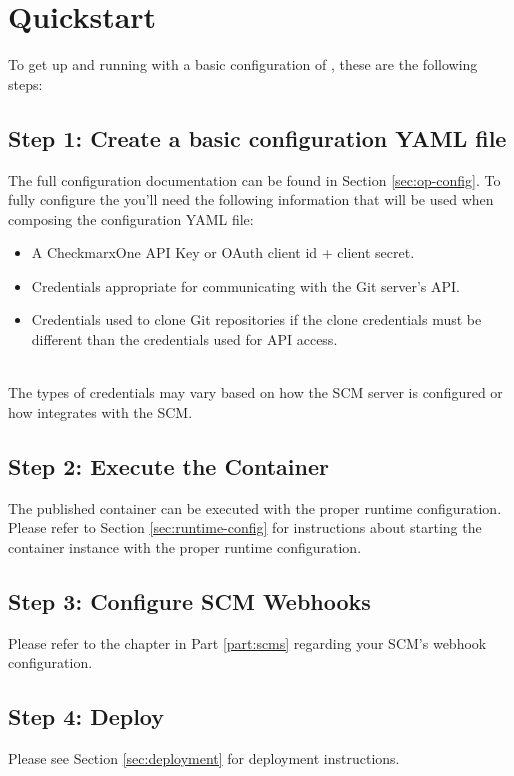 \chapter{Quickstart}

To get up and running with a basic configuration of \cxoneflow, these are the following steps:


\section{Step 1: Create a basic configuration YAML file}

The full configuration documentation can be found in Section \ref{sec:op-config}. To fully configure the \cxoneflow you'll need
the following information that will be used when composing the configuration YAML file:

\begin{itemize}
    \item A CheckmarxOne API Key or OAuth client id + client secret.
    \item Credentials appropriate for communicating with the Git server's API.
    \item Credentials used to clone Git repositories if the clone credentials must be different than the credentials used for API access.
\end{itemize}

\noindent\\The types of credentials may vary based on how the SCM server is configured or how \cxoneflow
integrates with the SCM.

\section{Step 2: Execute the \cxoneflow Container}

The published \cxoneflow container can be executed with the proper runtime configuration.  Please refer
to Section \ref{sec:runtime-config} for instructions about starting the \cxoneflow container instance with
the proper runtime configuration.


\section{Step 3: Configure SCM Webhooks}

Please refer to the chapter in Part \ref{part:scms} regarding your SCM's webhook configuration.

\section{Step 4: Deploy}

Please see Section \ref{sec:deployment} for deployment instructions.
